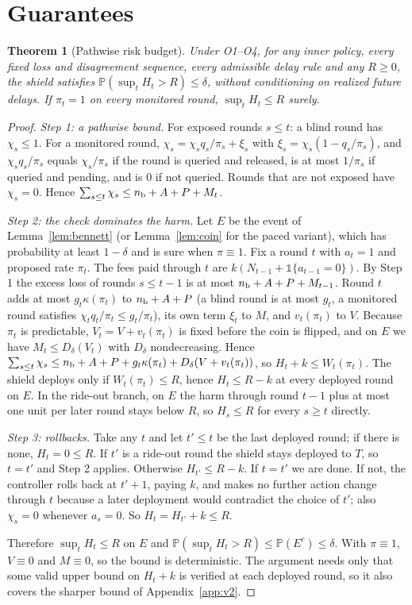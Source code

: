 \documentclass[10pt]{article}
\theoremstyle{plain}
\newtheorem{theorem}{Theorem}
\theoremstyle{definition}
\newcommand{\PP}{\mathbb{P}}
\newcommand{\one}{\mathds{1}}
\begin{document}
\section{Guarantees}\label{sec:theory}
\begin{samepage}
\begin{theorem}[Pathwise risk budget]\label{thm:main}
Under O1--O4, for any inner policy, every fixed loss and disagreement sequence, every admissible delay rule and any $R\ge0$, the shield satisfies $\PP(\sup_tH_t>R)\le\delta$, without conditioning on realized future delays. If $\pi_t=1$ on every monitored round, $\sup_tH_t\le R$ surely.
\end{theorem}
\end{samepage}
\begin{proof}
\emph{Step 1: a pathwise bound.} For exposed rounds $s\le t$: a blind round has $\chi_s\le1$. For a monitored round, $\chi_s=\chi_sq_s/\pi_s+\xi_s$ with $\xi_s=\chi_s(1-q_s/\pi_s)$, and $\chi_sq_s/\pi_s$ equals $\chi_s/\pi_s$ if the round is queried and released, is at most $1/\pi_s$ if queried and pending, and is $0$ if not queried. Rounds that are not exposed have $\chi_s=0$. Hence $\sum_{s\le t}\chi_s\le n_{\rm b}+A+P+M_t$.

\emph{Step 2: the check dominates the harm.} Let $E$ be the event of Lemma~\ref{lem:bennett} (or Lemma~\ref{lem:coin} for the paced variant), which has probability at least $1-\delta$ and is sure when $\pi\equiv1$. Fix a round $t$ with $a_t=1$ and proposed rate $\pi_t$. The fees paid through $t$ are $k(N_{t-1}+\one\{a_{t-1}=0\})$. By Step 1 the excess loss of rounds $s\le t-1$ is at most $n_{\rm b}+A+P+M_{t-1}$. Round $t$ adds at most $g_t\kappa(\pi_t)$ to $n_{\rm b}+A+P$ (a blind round is at most $g_t$, a monitored round satisfies $\chi_tq_t/\pi_t\le g_t/\pi_t$), its own term $\xi_t$ to $M$, and $v_t(\pi_t)$ to $V$. Because $\pi_t$ is predictable, $V_t=V+v_t(\pi_t)$ is fixed before the coin is flipped, and on $E$ we have $M_t\le D_\delta(V_t)$ with $D_\delta$ nondecreasing. Hence $\sum_{s\le t}\chi_s\le n_{\rm b}+A+P+g_t\kappa(\pi_t)+D_\delta(V+v_t(\pi_t))$, so $H_t+k\le W_t(\pi_t)$. The shield deploys only if $W_t(\pi_t)\le R$, hence $H_t\le R-k$ at every deployed round on $E$. In the ride-out branch, on $E$ the harm through round $t-1$ plus at most one unit per later round stays below $R$, so $H_s\le R$ for every $s\ge t$ directly.

\emph{Step 3: rollbacks.} Take any $t$ and let $t'\le t$ be the last deployed round; if there is none, $H_t=0\le R$. If $t'$ is a ride-out round the shield stays deployed to $T$, so $t=t'$ and Step 2 applies. Otherwise $H_{t'}\le R-k$. If $t=t'$ we are done. If not, the controller rolls back at $t'+1$, paying $k$, and makes no further action change through $t$ because a later deployment would contradict the choice of $t'$; also $\chi_s=0$ whenever $a_s=0$. So $H_t=H_{t'}+k\le R$.

Therefore $\sup_tH_t\le R$ on $E$ and $\PP(\sup_tH_t>R)\le\PP(E^c)\le\delta$. With $\pi\equiv1$, $V\equiv0$ and $M\equiv0$, so the bound is deterministic. The argument needs only that some valid upper bound on $H_t+k$ is verified at each deployed round, so it also covers the sharper bound of Appendix~\ref{app:v2}.
\end{proof}
\end{document}
